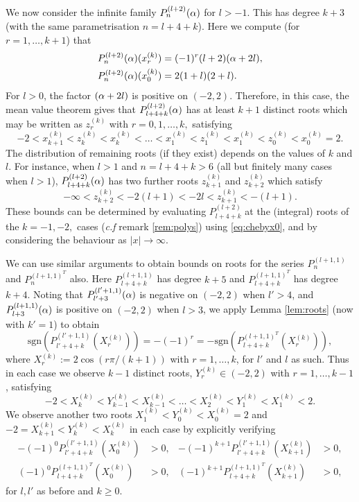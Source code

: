 \mdef We now consider the infinite family $P_n^{(l+2)}(\alpha)$ for $l>-1$. This has degree $k+3$ (with the same parametrisation $n=l+4+k$). Here we compute (for $r=1,\dots, k+1$) that
\begin{align*}
    P_n^{(l+2)}(\alpha)(x_r^{(k)})&=(-1)^r(l+2)(\alpha+2 l),\\
    P_n^{(l+2)}(\alpha)(x_0^{(k)})&=2 (1 + l) (2 + l). 
\end{align*}
For $l>0$, the factor $(\alpha+2 l)$ is positive on $(-2,2)$. Therefore, in this case, the mean value theorem gives that $P_{l+4+k}^{(l+2)}(\alpha)$ has at least $k+1$ distinct roots which may be written as $z^{(k)}_{r}$ with $r=0,1,\dots,k,$ satisfying
\[-2<x_{k+1}^{(k)}<z_k^{(k)}<x_{k}^{(k)}< \dots<x_1^{(k)}<z^{(k)}_{1}<x_1^{(k)}<z^{(k)}_{0}<x_0^{(k)}=2.\]
The distribution of remaining roots (if they exist) depends on the values of $k$ and $l$. For instance, when $l>1$ and $n=l+4+k>6$ (all but finitely many cases when $l>1$), $P_{l+4+k}^{(l+2)}(\alpha)$ has two further roots $z^{(k)}_{k+1}$ and $z^{(k)}_{k+2}$ which satisfy
\[-\infty< z^{(k)}_{k+2}<- 2 (l+1) <- 2 l <z^{(k)}_{k+1}<-(l+1).\]
These bounds can be determined by evaluating $P_{l+4+k}^{(l+2)}$ at the (integral) roots of the $k=-1,-2,$ cases (\textit{c.f} remark \ref{rem:polys}) using \eqref{eq:chebyx0}, and by considering the behaviour as $|x|\to \infty$.

\mdef We can use similar arguments to obtain bounds on roots for the series $P^{(l+1,1)}_{n}$ and $P^{(l+1,1)^T}_{n}$ also. Here $P^{(l+1,1)}_{l+4+k}$ has degree $k+5$ and $P^{(l+1,1)^T}_{l+4+k}$ has degree $k+4$. Noting that $P^{(l'+1,1)}_{l'+3}(\alpha)$ is negative on $(-2,2)$ when $l'>4$, and $P^{(l+1,1)}_{l+3}(\alpha)$ is positive on $(-2,2)$ when $l>3$, we apply Lemma \ref{lem:roots} (now with $k'=1$) to obtain 
\[
    \text{sgn}(P^{(l'+1,1)}_{l'+4+k}(X_r^{(k)}))=-(-1)^r=
    -\text{sgn}(P^{(l+1,1)^T}_{l+4+k}(X_r^{(k)})),
\]  
where $X_r^{(k)}:=2\cos(r \pi/(k+1))$ with $r=1,\dots,k$, for $l'$ and $l$ as such. Thus in each case we observe $k-1$ distinct roots, $Y_r^{(k)}\in (-2,2)$ with $r=1,\dots,k-1$, satisfying
\[-2<X_{k}^{(k)}<Y_{k-1}^{(k)}<X_{k-1}^{(k)}< \dots<X_2^{(k)}<Y^{(k)}_{1}<X_1^{(k)}<2.\]
We observe another two roots $X_1^{(k)}<Y_0^{(k)}<X_{0}^{(k)}=2$ and $-2=X_{k+1}^{(k)}<Y_{k}^{(k)}<X_{k}^{(k)}$ in each case by explicitly verifying
\begin{align*}
    -(-1)^0P^{(l'+1,1)}_{l'+4+k}(X_0^{(k)})&>0, &
    -(-1)^{k+1} P^{(l'+1,1)}_{l'+4+k}(X_{k+1}^{(k)})&>0,\\
    (-1)^{0} P^{(l+1,1)^T}_{l+4+k}(X_{0}^{(k)})&>0, &
    (-1)^{k+1} P^{(l+1,1)^T}_{l+4+k}(X_{k+1}^{(k)})&>0,
\end{align*}
for $l,l'$ as before and $k\geq 0$. 

